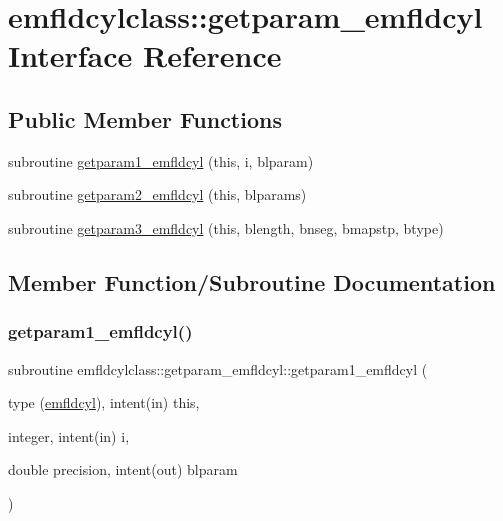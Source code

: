 \hypertarget{interfaceemfldcylclass_1_1getparam__emfldcyl}{}\section{emfldcylclass\+::getparam\+\_\+emfldcyl Interface Reference}
\label{interfaceemfldcylclass_1_1getparam__emfldcyl}
\subsection*{Public Member Functions}
\begin{DoxyCompactItemize}
\item 
subroutine \mbox{\hyperlink{interfaceemfldcylclass_1_1getparam__emfldcyl_a58862675ba9fd1db08913dffa8a65ced}{getparam1\+\_\+emfldcyl}} (this, i, blparam)
\item 
subroutine \mbox{\hyperlink{interfaceemfldcylclass_1_1getparam__emfldcyl_af8daf9322dc5c8d3527b89e1cb692688}{getparam2\+\_\+emfldcyl}} (this, blparams)
\item 
subroutine \mbox{\hyperlink{interfaceemfldcylclass_1_1getparam__emfldcyl_aef691e07cb8b99a1c1c3de2a7089f70d}{getparam3\+\_\+emfldcyl}} (this, blength, bnseg, bmapstp, btype)
\end{DoxyCompactItemize}


\subsection{Member Function/\+Subroutine Documentation}
\mbox{\label{interfaceemfldcylclass_1_1getparam__emfldcyl_a58862675ba9fd1db08913dffa8a65ced}} 
\subsubsection{\texorpdfstring{getparam1\_emfldcyl()}{getparam1\_emfldcyl()}}
{\footnotesize\ttfamily subroutine emfldcylclass\+::getparam\+\_\+emfldcyl\+::getparam1\+\_\+emfldcyl (\begin{DoxyParamCaption}\item[{type (\mbox{\hyperlink{namespaceemfldcylclass_structemfldcylclass_1_1emfldcyl}{emfldcyl}}), intent(in)}]{this,  }\item[{integer, intent(in)}]{i,  }\item[{double precision, intent(out)}]{blparam }\end{DoxyParamCaption})}

